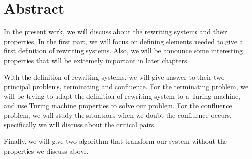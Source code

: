 \chapter*{Abstract}

In the present work, we will discuss about the rewriting systems and
their properties. In the first part, we will focus on defining
elements needed to give a first definition of rewriting systems. Also,
we will be announce some interesting properties that will be extremely
important in later chapters.

With the definition of rewriting systems, we will give answer to their
two principal problems, terminating and confluence. For the
terminating problem, we will be trying to adapt the definition of
rewriting system to a Turing machine, and use Turing machine
properties to solve our problem. For the confluence problem, we will
study the situations when we doubt the confluence occurs, specifically
we will discuss about the critical pairs.

Finally, we will give two algorithm that transform our system without
the properties we discuss above.

